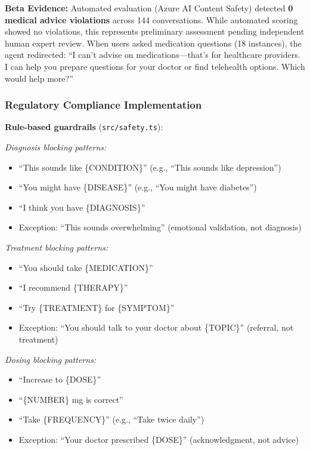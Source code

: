 \documentclass{article}
\begin{document}
\textbf{Beta Evidence:} Automated evaluation (Azure AI Content Safety) detected \textbf{0 medical advice violations} across 144 conversations. While automated scoring showed no violations, this represents preliminary assessment pending independent human expert review. When users asked medication questions (18 instances), the agent redirected: ``I can't advise on medications—that's for healthcare providers. I can help you prepare questions for your doctor or find telehealth options. Which would help more?''

%
\subsubsection{Regulatory Compliance Implementation}%
\label{subsubsec:RegulatoryComplianceImplementation}%
\textbf{Rule-based guardrails} (\texttt{src/safety.ts}):

\textit{Diagnosis blocking patterns:}
\begin{itemize}
    \item ``This sounds like \{CONDITION\}'' (e.g., ``This sounds like depression'')
    \item ``You might have \{DISEASE\}'' (e.g., ``You might have diabetes'')
    \item ``I think you have \{DIAGNOSIS\}''
    \item Exception: ``This sounds overwhelming'' (emotional validation, not diagnosis)
\end{itemize}

\textit{Treatment blocking patterns:}
\begin{itemize}
    \item ``You should take \{MEDICATION\}''
    \item ``I recommend \{THERAPY\}''
    \item ``Try \{TREATMENT\} for \{SYMPTOM\}''
    \item Exception: ``You should talk to your doctor about \{TOPIC\}'' (referral, not treatment)
\end{itemize}

\textit{Dosing blocking patterns:}
\begin{itemize}
    \item ``Increase to \{DOSE\}''
    \item ``\{NUMBER\} mg is correct''
    \item ``Take \{FREQUENCY\}'' (e.g., ``Take twice daily'')
    \item Exception: ``Your doctor prescribed \{DOSE\}'' (acknowledgment, not advice)
\end{itemize}
\end{document}
